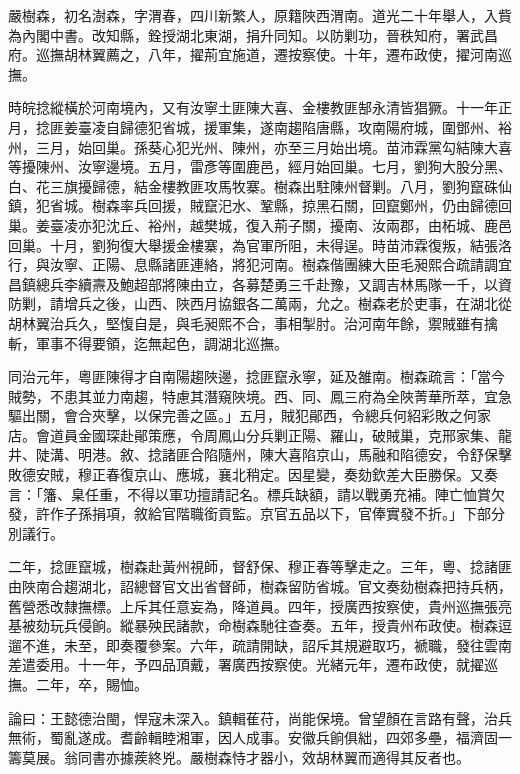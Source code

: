 \begin{pinyinscope}
嚴樹森，初名澍森，字渭春，四川新繁人，原籍陜西渭南。道光二十年舉人，入貲為內閣中書。改知縣，銓授湖北東湖，捐升同知。以防剿功，晉秩知府，署武昌府。巡撫胡林翼薦之，八年，擢荊宜施道，遷按察使。十年，遷布政使，擢河南巡撫。

時皖捻縱橫於河南境內，又有汝寧土匪陳大喜、金樓教匪郜永清皆猖獗。十一年正月，捻匪姜臺凌自歸德犯省城，援軍集，遂南趨陷唐縣，攻南陽府城，圍鄧州、裕州，三月，始回巢。孫葵心犯光州、陳州，亦至三月始出境。苗沛霖黨勾結陳大喜等擾陳州、汝寧邊境。五月，雷彥等圍鹿邑，經月始回巢。七月，劉狗大股分黑、白、花三旗擾歸德，結金樓教匪攻馬牧寨。樹森出駐陳州督剿。八月，劉狗竄硃仙鎮，犯省城。樹森率兵回援，賊竄汜水、鞏縣，掠黑石關，回竄鄭州，仍由歸德回巢。姜臺凌亦犯沈丘、裕州，越樊城，復入荊子關，擾南、汝兩郡，由柘城、鹿邑回巢。十月，劉狗復大舉援金樓寨，為官軍所阻，未得逞。時苗沛霖復叛，結張洛行，與汝寧、正陽、息縣諸匪連絡，將犯河南。樹森偕團練大臣毛昶熙合疏請調宜昌鎮總兵李續燾及鮑超部將陳由立，各募楚勇三千赴豫，又調吉林馬隊一千，以資防剿，請增兵之後，山西、陜西月協銀各二萬兩，允之。樹森老於吏事，在湖北從胡林翼治兵久，堅愎自是，與毛昶熙不合，事相掣肘。治河南年餘，禦賊雖有擒斬，軍事不得要領，迄無起色，調湖北巡撫。

同治元年，粵匪陳得才自南陽趨陜邊，捻匪竄永寧，延及雒南。樹森疏言：「當今賊勢，不患其並力南趨，特慮其潛窺陜境。西、同、鳳三府為全陜菁華所萃，宜急驅出關，會合夾擊，以保完善之區。」五月，賊犯鄖西，令總兵何紹彩敗之何家店。會道員金國琛赴鄖策應，令周鳳山分兵剿正陽、羅山，破賊巢，克邢家集、龍井、陡溝、明港。敘、捻諸匪合陷隨州，陳大喜陷京山，馬融和陷德安，令舒保擊敗德安賊，穆正春復京山、應城，襄北稍定。因星變，奏劾欽差大臣勝保。又奏言：「籓、臬任重，不得以軍功擅請記名。標兵缺額，請以戰勇充補。陣亡恤賞欠發，許作子孫捐項，敘給官階職銜貢監。京官五品以下，官俸實發不折。」下部分別議行。

二年，捻匪竄城，樹森赴黃州視師，督舒保、穆正春等擊走之。三年，粵、捻諸匪由陜南合趨湖北，詔總督官文出省督師，樹森留防省城。官文奏劾樹森把持兵柄，舊營悉改隸撫標。上斥其任意妄為，降道員。四年，授廣西按察使，貴州巡撫張亮基被劾玩兵侵餉。縱暴殃民諸款，命樹森馳往查奏。五年，授貴州布政使。樹森逗遛不進，未至，即奏覆參案。六年，疏請開缺，詔斥其規避取巧，褫職，發往雲南差遣委用。十一年，予四品頂戴，署廣西按察使。光緒元年，遷布政使，就擢巡撫。二年，卒，賜恤。

論曰：王懿德治閩，悍寇未深入。鎮輯萑苻，尚能保境。曾望顏在言路有聲，治兵無術，蜀亂遂成。耆齡輯睦湘軍，因人成事。安徽兵餉俱絀，四郊多壘，福濟固一籌莫展。翁同書亦據蒺終兇。嚴樹森恃才器小，效胡林翼而適得其反者也。


\end{pinyinscope}